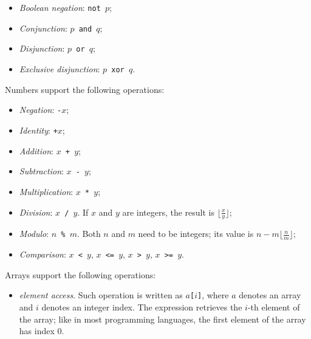 \documentclass[11pt, american, draft]{PhdThesis}
\begin{document}
  \begin{itemize}[noitemsep,topsep=0pt]
    \item \emph{Boolean negation}: \mbox{\texttt{not $p$}};
    \item \emph{Conjunction}: \mbox{\texttt{$p$ and $q$}};
    \item \emph{Disjunction}: \mbox{\texttt{$p$ or $q$}};
    \item \emph{Exclusive disjunction}: \mbox{\texttt{$p$ xor $q$}}.
  \end{itemize}

  Numbers support the following operations:

  \begin{itemize}[noitemsep,topsep=0pt]
    \item \emph{Negation}: \mbox{\texttt{-$x$}};

    \item \emph{Identity}: \mbox{\texttt{+$x$}};

    \item \emph{Addition}: \mbox{\texttt{$x$ + $y$}};

    \item \emph{Subtraction}: \mbox{\texttt{$x$ - $y$}};

    \item \emph{Multiplication}: \mbox{\texttt{$x$ * $y$}};

    \item \emph{Division}: \mbox{\texttt{$x$ / $y$}}. If $x$ and $y$ are integers, the result is
          \mbox{$\lfloor\frac{x}{y}\rfloor$};

    \item \emph{Modulo}: \mbox{\texttt{$n$ \% $m$}}. Both $n$ and $m$ need to be integers; its value
          is \mbox{$n - m \lfloor\frac{n}{m}\rfloor$};

    \item \emph{Comparison}: \mbox{\texttt{$x$ < $y$}}, \mbox{\texttt{$x$ <= $y$}},
          \mbox{\texttt{$x$ > $y$}}, \mbox{\texttt{$x$ >= $y$}}.
  \end{itemize}

  Arrays support the following operations:

  \begin{itemize}[noitemsep,topsep=0pt]
    \item \emph{element access}. Such operation is written as \mbox{\texttt{$a$[$i$]}}, where $a$
          denotes an array and $i$ denotes an integer index. The expression retrieves the $i$-th
          element of the array; like in most programming languages, the first element of the array
          has index $0$.
  \end{itemize}
\end{document}
